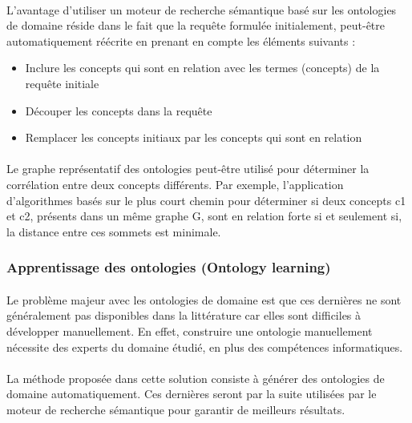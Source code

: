 \documentclass[12pt, a4paper, oneside]{book}
\begin{document}
\paragraph{}
L'avantage d'utiliser un moteur de recherche sémantique basé sur les ontologies de domaine réside dans le fait que la requête formulée initialement, peut-être automatiquement réécrite en prenant en compte les éléments suivants \citep{avantage} : 

\begin{itemize}
\item Inclure les concepts qui sont en relation avec les termes (concepts) de la requête initiale
\item Découper les concepts dans la requête
\item Remplacer les concepts initiaux par les concepts qui sont en relation
\end{itemize}

\paragraph{}
Le graphe représentatif des ontologies peut-être utilisé pour déterminer la corrélation entre deux concepts différents. Par exemple, l'application d'algorithmes basés sur le plus court chemin pour déterminer si deux concepts c1 et c2, présents dans un même graphe G, sont en relation forte si et seulement si, la distance entre ces sommets est minimale.



\subsubsection{Apprentissage des ontologies (Ontology learning) }
\paragraph{}
Le problème majeur avec les ontologies de domaine est que ces dernières ne sont généralement pas disponibles dans la littérature car elles sont difficiles à développer manuellement. En effet, construire une ontologie manuellement nécessite des experts du domaine étudié, en plus des compétences informatiques. 
\paragraph{}
La méthode proposée dans cette solution consiste à générer des ontologies de domaine automatiquement. Ces dernières seront par la suite utilisées par le moteur de recherche sémantique pour garantir de meilleurs résultats.
\end{document}
